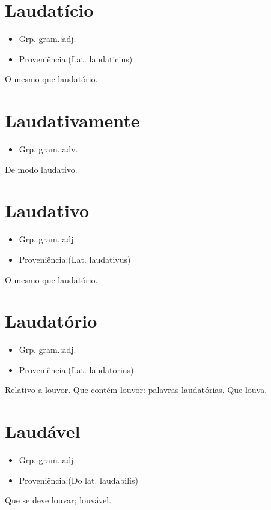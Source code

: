 \section{Laudatício}
\begin{itemize}
\item {Grp. gram.:adj.}
\end{itemize}
\begin{itemize}
\item {Proveniência:(Lat. \textunderscore laudaticius\textunderscore )}
\end{itemize}
O mesmo que \textunderscore laudatório\textunderscore .
\section{Laudativamente}
\begin{itemize}
\item {Grp. gram.:adv.}
\end{itemize}
De modo laudativo.
\section{Laudativo}
\begin{itemize}
\item {Grp. gram.:adj.}
\end{itemize}
\begin{itemize}
\item {Proveniência:(Lat. \textunderscore laudativus\textunderscore )}
\end{itemize}
O mesmo que \textunderscore laudatório\textunderscore .
\section{Laudatório}
\begin{itemize}
\item {Grp. gram.:adj.}
\end{itemize}
\begin{itemize}
\item {Proveniência:(Lat. \textunderscore laudatorius\textunderscore )}
\end{itemize}
Relativo a louvor.
Que contém louvor: \textunderscore palavras laudatórias\textunderscore .
Que louva.
\section{Laudável}
\begin{itemize}
\item {Grp. gram.:adj.}
\end{itemize}
\begin{itemize}
\item {Proveniência:(Do lat. \textunderscore laudabilis\textunderscore )}
\end{itemize}
Que se deve louvar; louvável.
